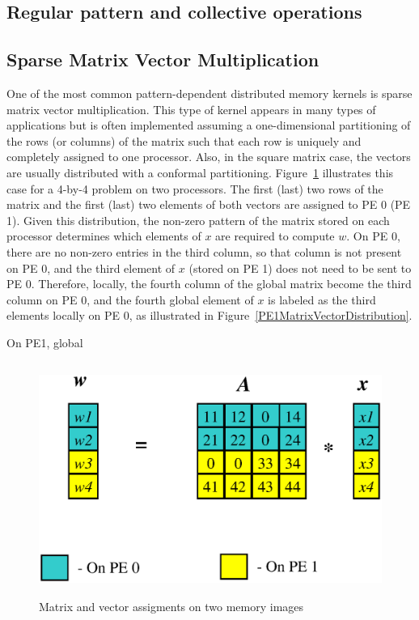 \documentclass[10pt,relax]{PetraObjectModel}
\begin{document}
\subsection{Regular pattern and collective operations}

\subsection{Sparse Matrix Vector Multiplication}

One of the most common pattern-dependent distributed memory
kernels is sparse matrix vector multiplication.
This type of kernel appears in many types of applications but
is often implemented assuming a
one-dimensional partitioning of the rows (or columns) of the
matrix such that each row is uniquely and
completely assigned to one processor.  Also, in the square
matrix case, the vectors are usually distributed
with a conformal partitioning.  Figure~\ref{MatrixVectorDistribution}
illustrates this case for a 4-by-4
problem on two processors.  The first (last) two rows of
the matrix and the first (last) two elements of
both vectors are assigned to PE 0 (PE 1).  Given this
distribution, the non-zero pattern of the matrix stored
on each processor determines which elements of $x$ are
required to compute $w$.  On PE 0, there are no
non-zero entries in the third column, so that column is
not present on PE 0, and the third element of $x$
(stored on PE 1) does not need to be sent to PE 0.
Therefore, locally, the fourth
column of the global matrix become the third column on
PE 0, and the fourth global element of $x$ is labeled
as the third elements locally on PE 0, as illustrated
in Figure~\ref{PE1MatrixVectorDistribution}.

On PE1, global

\begin{figure}
\begin{center}
\includegraphics[height=3in]{TwoPESpMV}
\end{center}
\label{MatrixVectorDistribution}
\caption{Matrix and vector assigments on two memory images}
\end{figure}
\end{document}
